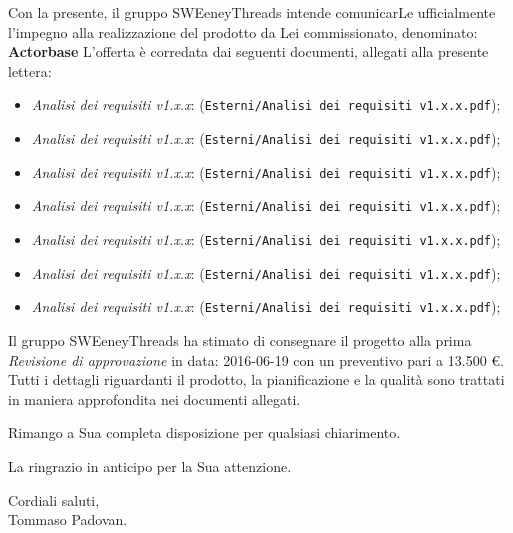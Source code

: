 \documentclass[a4paper]{article}
\begin{document}
	\vspace{5mm}Con la presente, il gruppo SWEeneyThreads intende comunicarLe ufficialmente l'impegno 
	alla realizzazione del prodotto da Lei commissionato, denominato: {\textbf{Actorbase}} \newline
	L'offerta è corredata dai seguenti documenti, allegati alla presente lettera:
	\begin{itemize}
		\item \emph{Analisi dei requisiti v1.x.x}: (\verb|Esterni/Analisi dei requisiti v1.x.x.pdf|);
		\item \emph{Analisi dei requisiti v1.x.x}: (\verb|Esterni/Analisi dei requisiti v1.x.x.pdf|);
		\item \emph{Analisi dei requisiti v1.x.x}: (\verb|Esterni/Analisi dei requisiti v1.x.x.pdf|);
		\item \emph{Analisi dei requisiti v1.x.x}: (\verb|Esterni/Analisi dei requisiti v1.x.x.pdf|);
		\item \emph{Analisi dei requisiti v1.x.x}: (\verb|Esterni/Analisi dei requisiti v1.x.x.pdf|);
		\item \emph{Analisi dei requisiti v1.x.x}: (\verb|Esterni/Analisi dei requisiti v1.x.x.pdf|);
		\item \emph{Analisi dei requisiti v1.x.x}: (\verb|Esterni/Analisi dei requisiti v1.x.x.pdf|);
	\end{itemize}
	Il gruppo SWEeneyThreads ha stimato di consegnare il progetto alla prima \emph{Revisione di approvazione}
	in data: 2016-06-19 con un preventivo pari a 13.500 \euro .
	Tutti i dettagli riguardanti il prodotto, la pianificazione e la qualità sono trattati in maniera approfondita 
	nei documenti allegati.
	\begin{flushleft}
	\vspace{2cm}
		Rimango a Sua completa disposizione per qualsiasi chiarimento.
	\end{flushleft}
	\begin{flushleft}
		La ringrazio in anticipo per la Sua attenzione.
	\end{flushleft}
	\vspace{5mm}
	\begin{center}
		Cordiali saluti,\\
		\vspace{1cm}Tommaso Padovan.
	\end{center}
	
\end{document}
